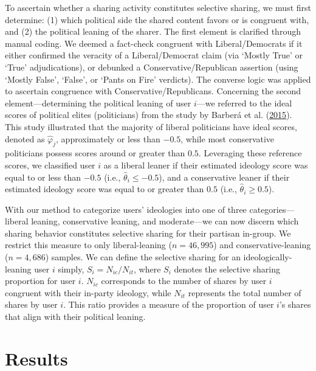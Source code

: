 \documentclass[
  12pt,
]{article}
\begin{document}
To ascertain whether a sharing activity constitutes selective sharing,
we must first determine: (1) which political side the shared content
favors or is congruent with, and (2) the political leaning of the
sharer. The first element is clarified through manual coding. We deemed
a fact-check congruent with Liberal/Democrats if it either confirmed the
veracity of a Liberal/Democrat claim (via `Mostly True' or `True'
adjudications), or debunked a Conservative/Republican assertion (using
`Mostly False', `False', or `Pants on Fire' verdicts). The converse
logic was applied to ascertain congruence with Conservative/Republicans.
Concerning the second element---determining the political leaning of
user \(i\)---we referred to the ideal scores of political elites
(politicians) from the study by Barberá et al.
(\protect\hyperlink{ref-barbera2015tweeting}{2015}). This study
illustrated that the majority of liberal politicians have ideal scores,
denoted as \(\hat{\varphi}_j\), approximately or less than \(-0.5\),
while most conservative politicians possess scores around or greater
than \(0.5\). Leveraging these reference scores, we classified user
\(i\) as a liberal leaner if their estimated ideology score was equal to
or less than \(-0.5\) (i.e., \(\hat{\theta}_i \leq -0.5\)), and a
conservative leaner if their estimated ideology score was equal to or
greater than \(0.5\) (i.e., \(\hat{\theta}_i \geq 0.5\)).

With our method to categorize users' ideologies into one of three
categories---liberal leaning, conservative leaning, and moderate---we
can now discern which sharing behavior constitutes selective sharing for
their partisan in-group. We restrict this measure to only
liberal-leaning (\(n = 46,995\)) and conservative-leaning
(\(n = 4,686\)) samples. We can define the selective sharing for an
ideologically-leaning user \(i\) simply, \(S_i = N_{ic}/N_{it}\), where
\(S_i\) denotes the selective sharing proportion for user \(i\).
\(N_{ic}\) corresponds to the number of shares by user \(i\) congruent
with their in-party ideology, while \(N_{it}\) represents the total
number of shares by user \(i\). This ratio provides a measure of the
proportion of user \(i\)'s shares that align with their political
leaning.

\hypertarget{results}{%
\section{Results}\label{results}}
\end{document}
